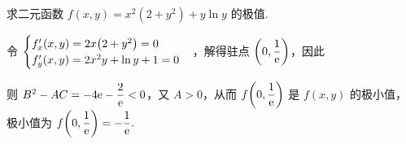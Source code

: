 \begin{example}[2009 数一]
    求二元函数 $f(x, y)=x^{2}\left(2+y^{2}\right)+y \ln y $ 的极值.
\end{example}
\begin{solution}
    令 $\begin{cases}
        f_x'(x,y)=2x\qty(2+y^2)=0\\
        f_y'(x,y)=2x^2y+\ln y+1=0
    \end{cases}$，解得驻点 $\qty(0,\dfrac{1}{\mathrm{e}})$，因此 
    则 $B^2-AC=-4\mathrm{e}-\dfrac{2}{\mathrm{e}}<0$，又 $A>0$，从而 $f\qty(0,\dfrac{1}{\mathrm{e}})$ 是 $f(x,y)$ 的极小值，极小值为 $f\qty(0,\dfrac{1}{\mathrm{e}})=-\dfrac{1}{\mathrm{e}}.$
\end{solution}

